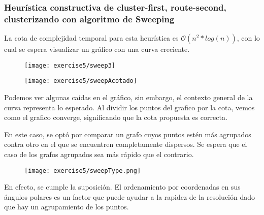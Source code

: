 \subsubsection{Heurística constructiva de cluster-first, route-second, clusterizando con algoritmo de Sweeping}


La cota de complejidad temporal para esta heurística es $\mathcal{O}(n^{2} * log(n))$, con lo cual se espera visualizar un gráfico con una curva creciente.

\begin{figure}[H]
	\centering
	\begin{minipage}[t]{.45\textwidth}
		\centering
		\texttt{[image: exercise5/sweep3]}
	\end{minipage}\qquad
	\begin{minipage}[t]{.45\textwidth}
		\centering
		\texttt{[image: exercise5/sweepAcotado]}
	\end{minipage}
\end{figure}

Podemos ver algunas caídas en el gráfico, sin embargo, el contexto general de la curva representa lo esperado. Al dividir los puntos del grafico por la cota, vemos como el grafico converge, significando que la cota propuesta es correcta.



En este caso, se optó por comparar un grafo cuyos puntos estén más agrupados contra otro en el que se encuentren completamente dispersos. Se espera que el caso de los grafos agrupados sea más rápido que el contrario.

\begin{figure}[H]
	\centering
	\texttt{[image: exercise5/sweepType.png]}
\end{figure}


En efecto, se cumple la suposición. El ordenamiento por coordenadas en sus ángulos polares es un factor que puede ayudar a la rapidez de la resolución dado que hay un agrupamiento de los puntos.